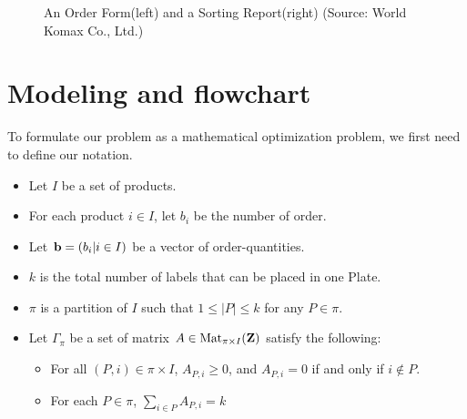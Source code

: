 \documentclass[review]{elsarticle}
\begin{document}
\begin{figure}[h!]
	\centering
	\caption{An Order Form(left) and a Sorting Report(right) (Source: World Komax Co., Ltd.)}
	\label{fig:Order_Sorting}       %
\end{figure}

\section{Modeling and flowchart}\label{sec:Modeling}
To formulate our problem as a mathematical optimization problem, we first need to define our notation.
\begin{itemize}[$\bullet$]
	\item Let $I$ be a set of products.
	\item For each product $i \in I$, let $b_{i}$ be the number of order.
	\item Let ${\bf b}=(b_{i}|i \in I)$ be a vector of order-quantities.
	\item $k$ is the total number of labels that can be placed in one Plate.
	\item $\pi$ is a partition of $I$ such that $1 \leq  |P| \leq k$ for any $P \in \pi$. 
	\item Let $\Gamma_{\pi}$ be a set of matrix $A \in {\rm Mat}_{\pi \times I}(\mathbf{Z})$ satisfy the following:
	\begin{itemize}[-]
		\item For all $(P,i) \in \pi \times I$, $A_{P,i} \geq 0$, and $A_{P,i} = 0$ if and only if $i \notin P$.
		\item For each $P \in \pi$, $\sum_{i \in P}A_{P, i} = k$
	\end{itemize}
\end{itemize}
\end{document}
